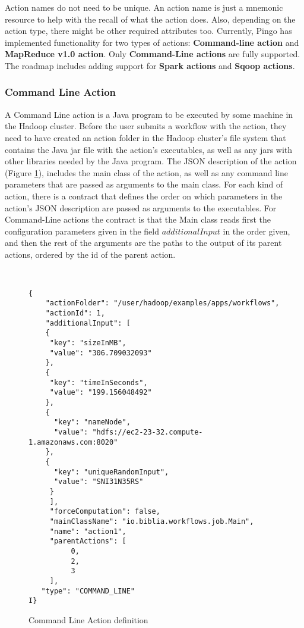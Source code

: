 Action names do not need to be unique. An action name is just a mnemonic resource to help with the recall of what the action does. Also, depending on the action type, there might be other required attributes too. Currently, Pingo has implemented functionality for two types of actions: \textbf{Command-line action} and \textbf{MapReduce v1.0 action}. Only \textbf{Command-Line actions} are fully supported. The roadmap includes adding support for \textbf{Spark actions} and \textbf{Sqoop actions}.

\subsubsection{Command Line Action}
A Command Line action is a Java program to be executed by some machine in the Hadoop cluster.  Before the user submits a workflow with the action, they need to have created an action folder in the Hadoop cluster's file system that contains the Java jar file with the action's executables, as well as any jars with other libraries needed by the Java program.  The JSON description of the action (Figure \ref{fig:command_line_action_definition}), includes the main class of the action, as well as any command line parameters that are passed as arguments to the main class. For each kind of action, there is a contract that defines the order on which parameters in the action's JSON description are passed as arguments to the executables. For Command-Line actions the contract is that the Main class reads first the configuration parameters given in the field $additionalInput$ in the order given, and then the rest of the arguments are the paths to the output of its parent actions, ordered by the id of the parent action.
\begin{figure}
\begin{mdframed}
\begin{singlespace}
\begin{verbatim}


{
    "actionFolder": "/user/hadoop/examples/apps/workflows", 
    "actionId": 1, 
    "additionalInput": [
    {
     "key": "sizeInMB",
     "value": "306.709032093"
    }, 
    {
     "key": "timeInSeconds", 
     "value": "199.156048492"
    }, 
    {
      "key": "nameNode", 
      "value": "hdfs://ec2-23-32.compute-1.amazonaws.com:8020"
    }, 
    {
      "key": "uniqueRandomInput", 
      "value": "SNI31N35RS"
     }
     ], 
     "forceComputation": false, 
     "mainClassName": "io.biblia.workflows.job.Main", 
     "name": "action1", 
     "parentActions": [
          0, 
          2, 
          3
     ], 
   "type": "COMMAND_LINE"
I}
\end{verbatim}
\end{singlespace}
\end{mdframed}
\caption{Command Line Action definition}
\label{fig:command_line_action_definition}
\end{figure}

